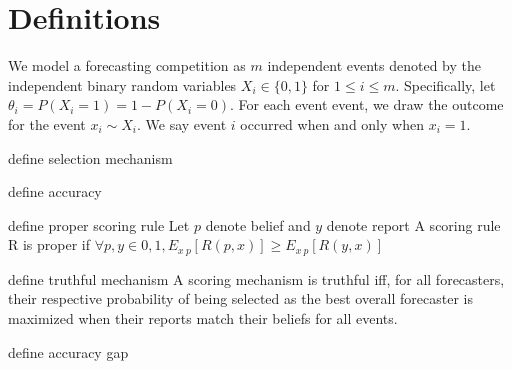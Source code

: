 \documentclass[letterpaper,12pt]{article}
\renewenvironment{abstract}
 {
  \begin{center}
  \vspace{3em} \bfseries \abstractname\vspace{0em}\vspace{0pt}
  \end{center}
  \list{}{%
    \setlength{\leftmargin}{20mm}%
    \setlength{\rightmargin}{\leftmargin}%
  }%
  \item\relax}
 {\endlist}
\newcommand{\1}{\mathbbm{1}}
\begin{document}


 


\section{Definitions}
We model a forecasting competition as $m$ independent events denoted by the independent binary random variables $X_i \in \{0, 1\}$ for $1 \leq i \leq m$. Specifically, let $\theta_i = P(X_i = 1) = 1 - P(X_i = 0)$. For each event event, we draw the outcome for the event $x_i \sim X_i$. We say event $i$ occurred when and only when $x_i = 1$. 

define selection mechanism

define accuracy

define proper scoring rule
Let $p$ denote belief and $y$ denote report
A scoring rule R is proper if $\forall p,y \in {0,1}, E_{x~p}[R(p,x)] \ge E_{x~p}[R(y,x)]$

define truthful mechanism
A scoring mechanism is truthful iff, for all forecasters, their respective probability of being selected as the best overall forecaster is maximized when their reports match their beliefs for all events. 

define accuracy gap
\end{document}

